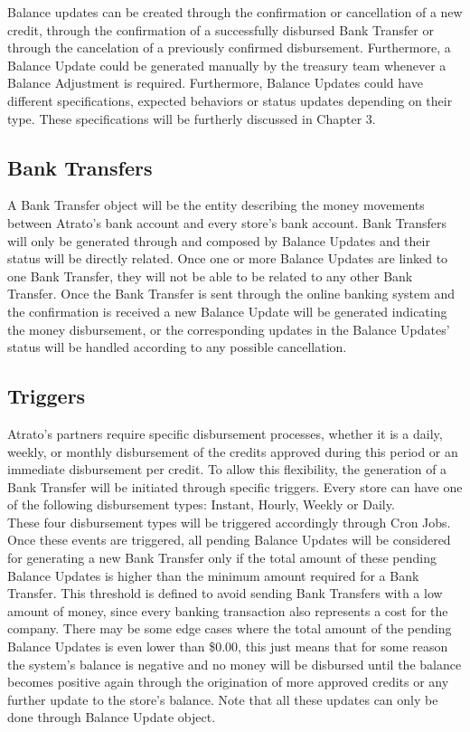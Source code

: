 Balance updates can be created through the confirmation or cancellation of a new credit, through the confirmation of a successfully disbursed Bank Transfer or through the cancelation of a previously confirmed disbursement. Furthermore, a Balance Update could be generated manually by the treasury team whenever a Balance Adjustment is required. Furthermore, Balance Updates could have different specifications, expected behaviors or status updates depending on their type. These specifications will be furtherly discussed in Chapter 3.

\subsection{Bank Transfers} 
A Bank Transfer object will be the entity describing the money movements between Atrato’s bank account and every store’s bank account. Bank Transfers will only be generated through and composed by Balance Updates and their status will be directly related. Once one or more Balance Updates are linked to one Bank Transfer, they will not be able to be related to any other Bank Transfer. Once the Bank Transfer is sent through the online banking system and the confirmation is received a new Balance Update will be generated indicating the money disbursement, or the corresponding updates in the Balance Updates’ status will be handled according to any possible cancellation.

\subsection{Triggers}
Atrato’s partners require specific disbursement processes, whether it is a daily, weekly, or monthly disbursement of the credits approved during this period or an immediate disbursement per credit. To allow this flexibility, the generation of a Bank Transfer will be initiated through specific triggers. Every store can have one of the following disbursement types: Instant, Hourly, Weekly or Daily.\\

These four disbursement types will be triggered accordingly through Cron Jobs. Once these events are triggered, all pending Balance Updates will be considered for generating a new Bank Transfer only if the total amount of these pending Balance Updates is higher than the minimum amount required for a Bank Transfer. This threshold is defined to avoid sending Bank Transfers with a low amount of money, since every banking transaction also represents a cost for the company. There may be some edge cases where the total amount of the pending Balance Updates is even lower than \$0.00, this just means that for some reason the system’s balance is negative and no money will be disbursed until the balance becomes positive again through the origination of more approved credits or any further update to the store’s balance. Note that all these updates can only be done through Balance Update object.

